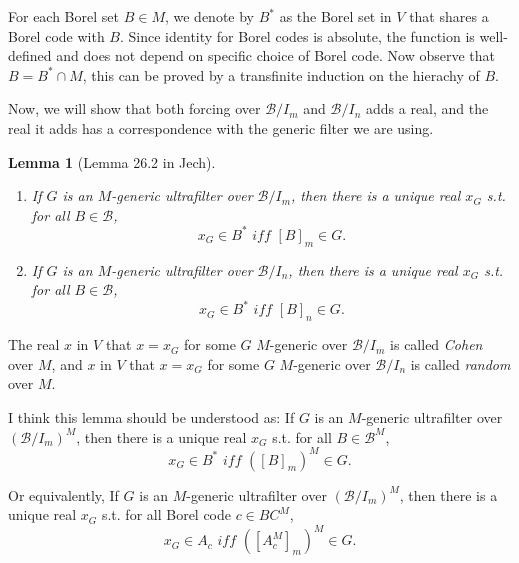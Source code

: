 \documentclass{article}
\newtheorem{lemma}{Lemma}
\begin{document}
For each Borel set $B\in M$, we denote by $B^*$ as the Borel set in $V$ that shares a Borel code with $B$. Since identity for Borel codes is absolute, the function is well-defined and does not depend on specific choice of Borel code. Now observe that $B = B^*\cap M$, this can be proved by a transfinite induction on the hierachy of $B$.

Now, we will show that both forcing over $\mathcal{B}/I_m$ and $\mathcal{B}/I_n$ adds a real, and the real it adds has a correspondence with the generic filter we are using.


\begin{lemma}[Lemma 26.2 in Jech]
    \begin{enumerate}
        \item If $G$ is an $M$-generic ultrafilter over $\mathcal{B}/I_m$, then there is a unique real $x_G$ s.t. for all $B\in \mathcal{B}$, $$x_G\in B^* \textit{ iff }[B]_m\in G.$$
        \item If $G$ is an $M$-generic ultrafilter over $\mathcal{B}/I_n$, then there is a unique real $x_G$ s.t. for all $B\in \mathcal{B}$, $$x_G\in B^* \textit{ iff }[B]_n\in G.$$
    \end{enumerate}
\end{lemma}

The real $x$ in $V$ that $x = x_G$ for some $G$ $M$-generic over $\mathcal{B}/I_m$ is called \textit{Cohen} over $M$, and $x$ in $V$ that $x = x_G$ for some $G$ $M$-generic over $\mathcal{B}/I_n$ is called \textit{random} over $M$.

I think this lemma should be understood as: If $G$ is an $M$-generic ultrafilter over $(\mathcal{B}/I_m)^M$, then there is a unique real $x_G$ s.t. for all $B\in \mathcal{B}^M$, $$x_G\in B^* \textit{ iff }([B]_m)^M\in G.$$

Or equivalently, If $G$ is an $M$-generic ultrafilter over $(\mathcal{B}/I_m)^M$, then there is a unique real $x_G$ s.t. for all Borel code $c\in BC^M$, $$x_G\in A_c \textit{ iff }([A_c^M]_m)^M\in G.$$
\end{document}
